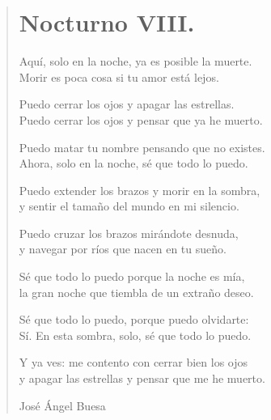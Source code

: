 \documentclass[11pt, portrait, twoside, notitlepage, openright]{book}
\begin{document}
\newpage
\begin{verse}
\begin{center}
\section{Nocturno VIII.}
\end{center}
Aquí, solo en la noche, ya es posible la muerte.\\
Morir es poca cosa si tu amor está lejos.
\newline

Puedo cerrar los ojos y apagar las estrellas.\\
Puedo cerrar los ojos y pensar que ya he muerto.
\newline

Puedo matar tu nombre pensando que no existes.\\
Ahora, solo en la noche, sé que todo lo puedo.
\newline

Puedo extender los brazos y morir en la sombra,\\
y sentir el tamaño del mundo en mi silencio.
\newline

Puedo cruzar los brazos mirándote desnuda,\\
y navegar por ríos que nacen en tu sueño.
\newpage

Sé que todo lo puedo porque la noche es mía,\\
la gran noche que tiembla de un extraño deseo.
\newline

Sé que todo lo puedo, porque puedo olvidarte:\\
Sí. En esta sombra, solo, sé que todo lo puedo.
\newline

Y ya ves: me contento con cerrar bien los ojos\\
y apagar las estrellas y pensar que me he muerto.
\newline

José Ángel Buesa
\end{verse}
\end{document}
